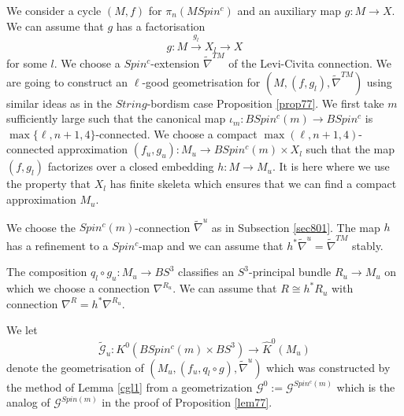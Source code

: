 \documentclass[12pt]{article}
\newcommand{\cG}{{\mathcal{G}}}
\begin{document}
We consider a cycle $(M,f)$ for $\pi_{n}(MSpin^{c})$
 and an auxiliary map $g:M\to X$. We can assume that $g$ has a factorisation
$$g:M\stackrel{g_{l}}{\to} X_{l}\to X$$ for some $l$. We choose  a $Spin^{c}$-extension $\tilde \nabla^{TM}$ of the Levi-Civita connection. 
We are going to construct an $\ell$-good geometrisation for $(M,(f,g_{l}),\tilde \nabla^{TM})$ using similar ideas as in the $String$-bordism case Proposition \ref{prop77}.
We first take $m$ sufficiently large such that the canonical map $\iota_{m}:BSpin^{c}(m)\to BSpin^{c}$ is $\max\{\ell,n+1,4\}$-connected.
We choose a compact $ \max(\ell,n+1,4)$-connected approximation $(f_{u},g_{u}):M_{u}\to BSpin^{c}(m)\times X_{l}$
such that the map $(f,g_{l})$ factorizes over a closed embedding
$h:M\to M_{u}$. It is here where we use the property that $X_{l}$ has finite skeleta  which ensures that we can find a compact approximation $M_{u}$.

We choose the $Spin^{c}(m)$-connection $\tilde \nabla^{u}$ as in  Subsection \ref{sec801}. The map $h$ has a refinement to a $Spin^{c}$-map 
and we can assume that $h^{*}\tilde \nabla^{u}=\tilde \nabla^{TM}$ stably. 
 
The composition $q_{l}\circ g_{u}:M_{u}\to BS^{3}$ classifies an $S^{3}$-principal bundle $R_{u}\to M_{u}$ on which we choose a connection $\nabla^{R_{u}}$. We can assume that  $R\cong h^{*}R_{u}$ with connection $\nabla^{R}=h^{*}\nabla^{R_{u}}$.

We let $$\tilde \cG_{u}:K^{0}(BSpin^{c}(m)\times  BS^{3})\to \hat K^{0}(M_{u})$$ denote the
geometrisation of $(M_{u},(f_{u},q_{l}\circ g),\tilde \nabla^{u})$ which was constructed by the method of   Lemma \ref{cgl1} from a geometrization $\cG^{0}:=\cG^{Spin^{c}(m)}$ which is the analog of $\cG^{Spin(m)}$ in the proof of Proposition \ref{lem77}.

 
\end{document}
